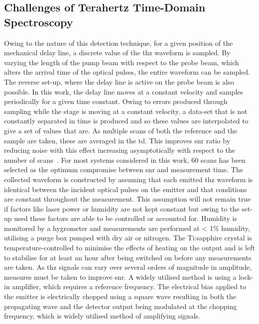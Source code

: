 \subsection{Challenges of Terahertz Time-Domain Spectroscopy}
Owing to the nature of this detection technique, for a given position of the mechanical delay line, a discrete value of the \acrshort{thz} waveform is sampled. By varying the length of the pump beam with respect to the probe beam, which alters the arrival time of the optical pulses, the entire waveform can be sampled. The reverse set-up, where the delay line is active on the probe beam is also possible. In this work, the delay line moves at a constant velocity and samples periodically for a given time constant. Owing to errors produced through sampling while the stage is moving at a constant velocity,  a data\nobreakdash-set that is not constantly separated in time is produced and so these values are interpolated to give a set of values that are. As multiple scans of both the reference and the sample are taken, these are averaged in the \acrshort{td}. This improves \acrshort{snr} ratio by reducing noise with this effect increasing asymptotically with respect to the number of scans~\cite{Popescu1996}. For most systems considered in this work, 60 scans has been selected as the optimum compromise between \acrshort{snr} and measurement time.
The collected waveform is constructed by assuming that each emitted \acrshort{thz} waveform is identical between the incident optical pulses on the emitter and that conditions are constant throughout the measurement. This assumption will not remain true if factors like laser power or humidity are not kept constant but owing to the set-up used these factors are able to be controlled or accounted for. Humidity is monitored by a hygrometer and measurements are performed at < 1\% humidity, utilising a purge box pumped with dry air or nitrogen. The Ti:sapphire crystal is temperature-controlled to minimise the effects of heating on the output and is left to stabilise for at least an hour after being switched on before any measurements are taken. 
As \acrshort{thz} signals can vary over several orders of magnitude in amplitude, measures must be taken to improve \acrshort{snr}. A widely utilised method is using a lock\nobreakdash-in amplifier, which requires a reference frequency. The electrical bias applied to the emitter is electrically chopped using a square wave resulting in both the propagating wave and the detector output being modulated at the chopping frequency, which is widely utilised method of amplifying signals.

